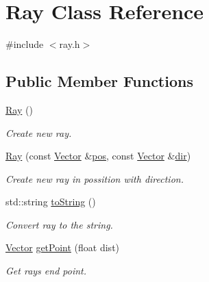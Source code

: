 \hypertarget{class_ray}{}\section{Ray Class Reference}
\label{class_ray}


{\ttfamily \#include $<$ray.\+h$>$}

\subsection*{Public Member Functions}
\begin{DoxyCompactItemize}
\item 
\mbox{\label{class_ray_a2e3d2c29f2df4ab3da10da79d4acb852}} 
\mbox{\hyperlink{class_ray_a2e3d2c29f2df4ab3da10da79d4acb852}{Ray}} ()
\begin{DoxyCompactList}\small\item\em Create new ray. \end{DoxyCompactList}\item 
\mbox{\label{class_ray_a297d6394114e02235276e3805e0b4e2d}} 
\mbox{\hyperlink{class_ray_a297d6394114e02235276e3805e0b4e2d}{Ray}} (const \mbox{\hyperlink{struct_vector}{Vector}} \&\mbox{\hyperlink{class_ray_a7efe0dcd9166fc825c09359460c8f99a}{pos}}, const \mbox{\hyperlink{struct_vector}{Vector}} \&\mbox{\hyperlink{class_ray_acfb8b7801f774b160fa51404dd65f2a5}{dir}})
\begin{DoxyCompactList}\small\item\em Create new ray in possition with direction. \end{DoxyCompactList}\item 
\mbox{\label{class_ray_a33ec01131777eb8f403fdf96a90c6baf}} 
std\+::string \mbox{\hyperlink{class_ray_a33ec01131777eb8f403fdf96a90c6baf}{to\+String}} ()
\begin{DoxyCompactList}\small\item\em Convert ray to the string. \end{DoxyCompactList}\item 
\mbox{\label{class_ray_a85585483de6a2fee24c6ca4aadf8980c}} 
\mbox{\hyperlink{struct_vector}{Vector}} \mbox{\hyperlink{class_ray_a85585483de6a2fee24c6ca4aadf8980c}{get\+Point}} (float dist)
\begin{DoxyCompactList}\small\item\em Get ray\textquotesingle{}s end point. \end{DoxyCompactList}\item 

\end{DoxyCompactItemize}
